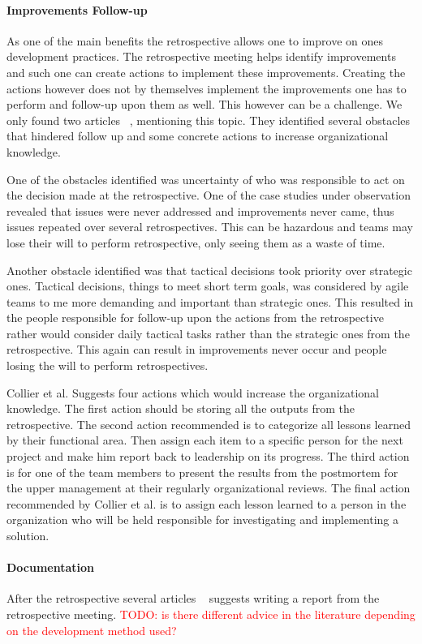 \documentclass[12pt]{article}
\newcommand\todo[1]{\textcolor{red}{#1}}
\begin{document}
\paragraph{Improvements Follow-up}
As one of the main benefits the retrospective allows one to improve on ones development practices. The retrospective meeting helps identify improvements and such one can create actions to implement these improvements. Creating the actions however does not by themselves implement the improvements one has to perform and follow-up upon them as well. This however can be a challenge. We only found two articles ~\cite{Drury2012, Collier1996}, mentioning this topic. They identified several obstacles that hindered follow up and some concrete actions to increase organizational knowledge. 

One of the obstacles identified was uncertainty of who was responsible to act on the decision made at the retrospective. One of the case studies under observation revealed that issues were never addressed and improvements never came, thus issues repeated over several retrospectives. This can be hazardous and teams may lose their will to perform retrospective, only seeing them as a waste of time. 

Another obstacle identified was that tactical decisions took priority over strategic ones. Tactical decisions, things to meet short term goals, was considered by agile teams to me more demanding and important than strategic ones. This resulted in the people responsible for follow-up upon the actions from the retrospective rather would consider daily tactical tasks rather than the strategic ones from the retrospective. This again can result in improvements never occur and people losing the will to perform retrospectives. 

Collier et al. Suggests four actions which would increase the organizational knowledge. The first action should be storing all the outputs from the retrospective. The second action recommended is to categorize all lessons learned by their functional area. Then assign each item to a specific person for the next project and make him report back to leadership on its progress. The third action is for one of the team members to present the results from the postmortem for the upper management at their regularly organizational reviews. The final action recommended by Collier et al. is to assign each lesson learned to a person in the organization who will be held responsible for investigating and implementing a solution. 

\paragraph{Documentation}
After the retrospective several articles ~\cite{Dingsoyr2005, Moe2001, Hanssen2003, Collier1996} suggests writing a report from the retrospective meeting. \todo{TODO: is there different advice in the literature depending on the development method used?}
\end{document}
